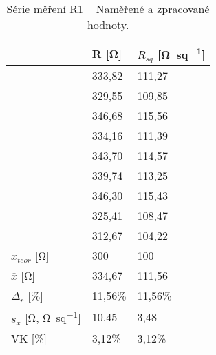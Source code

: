 \begin{table}[h!]
    \caption{Série měření R1 -- Naměřené a zpracované hodnoty.}
    \centering
    \def\arraystretch{1.4}
    \begin{tabular}{l|l|l}
                            & R [\unit{\ohm}]    & \(R_{sq}\) [\unit{\ohm\per sq}]  \\ \hline\hline
                            & 333,82 & 111,27 \\ \hline
                            & 329,55 & 109,85 \\ \hline
                            & 346,68 & 115,56 \\ \hline
                            & 334,16 & 111,39 \\ \hline
                            & 343,70 & 114,57 \\ \hline
                            & 339,74 & 113,25 \\ \hline
                            & 346,30 & 115,43 \\ \hline
                            & 325,41 & 108,47 \\ \hline
                            & 312,67 & 104,22 \\ \hline\hline
        \(x_{teor} \) [\unit{\ohm}]      & 300    & 100    \\ \hline
        \(\overline{x} \) [\unit{\ohm}]  & 334,67 & 111,56 \\ \hline
        \(\Delta_{r} \) [\unit{\percent}]    & 11,56\%& 11,56\%\\ \hline\hline
        \(s_{x} \) [\unit{\ohm}, \unit{\ohm\per sq}]         & 10,45  & 3,48   \\ \hline
        VK [\unit{\percent}]                 & 3,12\% & 3,12\% \\ 
    \end{tabular}
    \label{tab:r1_hodnoty}
\end{table}

